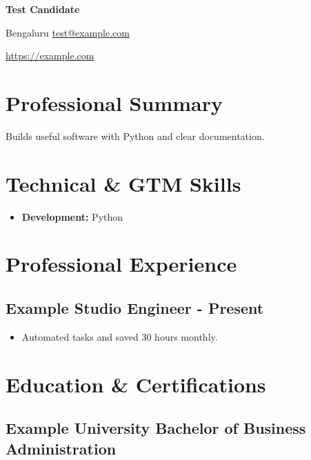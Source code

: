 \documentclass[10pt,a4paper]{article}
\begin{document}
\fontsize{9.1}{10.7}\selectfont
{\fontsize{19}{21}\selectfont\bfseries Test Candidate\par}
Bengaluru \textbar{} \href{mailto:test@example.com}{test@example.com}\par
\href{https://example.com}{https://example.com}\par
\section*{Professional Summary}
Builds useful software with Python and clear documentation.\par
\section*{Technical \& GTM Skills}
\begin{itemize}
\item \textbf{Development:} Python
\end{itemize}
\section*{Professional Experience}
\subsection*{Example Studio \textbar{} Engineer\hfill{ - Present}}
\begin{itemize}
\item Automated tasks and saved 30 hours monthly.
\end{itemize}
\section*{Education \& Certifications}
\subsection*{Example University \textbar{} Bachelor of Business Administration}
\end{document}
